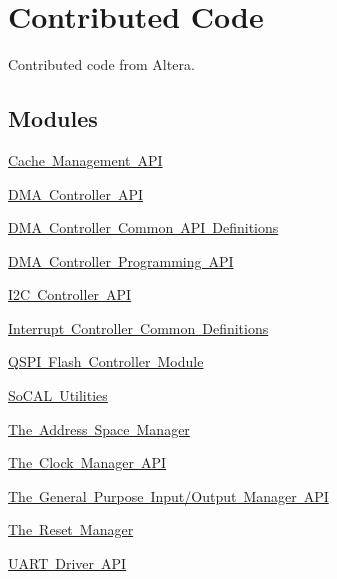 \hypertarget{group__RTEMSBSPsARMCycVContrib}{}\section{Contributed Code}
\label{group__RTEMSBSPsARMCycVContrib}


Contributed code from Altera.  


\subsection*{Modules}
\begin{DoxyCompactItemize}
\item 
\mbox{\hyperlink{group__CACHE__MGR}{Cache Management A\+PI}}
\item 
\mbox{\hyperlink{group__ALT__DMA}{D\+M\+A Controller A\+PI}}
\item 
\mbox{\hyperlink{group__ALT__DMA__COMMON}{D\+M\+A Controller Common A\+P\+I Definitions}}
\item 
\mbox{\hyperlink{group__ALT__DMA__PRG}{D\+M\+A Controller Programming A\+PI}}
\item 
\mbox{\hyperlink{group__ALT__I2C}{I2\+C Controller A\+PI}}
\item 
\mbox{\hyperlink{group__INT__COMMON}{Interrupt Controller Common Definitions}}
\item 
\mbox{\hyperlink{group__ALT__QSPI}{Q\+S\+P\+I Flash Controller Module}}
\item 
\mbox{\hyperlink{group__ALT__SOCAL__UTIL}{So\+C\+A\+L Utilities}}
\item 
\mbox{\hyperlink{group__ADDR__SPACE__MGR}{The Address Space Manager}}
\item 
\mbox{\hyperlink{group__CLK__MGR}{The Clock Manager A\+PI}}
\item 
\mbox{\hyperlink{group__ALT__GPIO__API}{The General Purpose Input/\+Output Manager A\+PI}}
\item 
\mbox{\hyperlink{group__RST__MGR}{The Reset Manager}}
\item 
\mbox{\hyperlink{group__UART}{U\+A\+R\+T Driver A\+PI}}
\end{DoxyCompactItemize}
